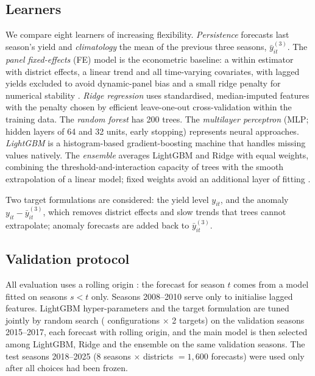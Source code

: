 \subsection{Learners}
We compare eight learners of increasing flexibility. \emph{Persistence} forecasts last season's yield and \emph{climatology} the mean of the previous three seasons, $\bar y^{(3)}_{it}$. The \emph{panel fixed-effects} (FE) model is the econometric baseline: a within estimator with district effects, a linear trend and all time-varying covariates, with lagged yields excluded to avoid dynamic-panel bias and a small ridge penalty for numerical stability \citep{wooldridge2010econometric}. \emph{Ridge regression} \citep{hoerl1970ridge} uses standardised, median-imputed features with the penalty chosen by efficient leave-one-out cross-validation within the training data. The \emph{random forest} \citep{breiman2001random} has 200 trees. The \emph{multilayer perceptron} (MLP; hidden layers of 64 and 32 units, early stopping) represents neural approaches. \emph{LightGBM} \citep{ke2017lightgbm} is a histogram-based gradient-boosting machine that handles missing values natively. The \emph{ensemble} averages LightGBM and Ridge with equal weights, combining the threshold-and-interaction capacity of trees with the smooth extrapolation of a linear model; fixed weights avoid an additional layer of fitting \citep[cf.][]{wolpert1992stacked}.

Two target formulations are considered: the yield level $y_{it}$, and the anomaly $y_{it}-\bar y^{(3)}_{it}$, which removes district effects and slow trends that trees cannot extrapolate; anomaly forecasts are added back to $\bar y^{(3)}_{it}$.

\subsection{Validation protocol}
All evaluation uses a rolling origin \citep{tashman2000out}: the forecast for season $t$ comes from a model fitted on seasons $s<t$ only. Seasons 2008--2010 serve only to initialise lagged features. LightGBM hyper-parameters and the target formulation are tuned jointly by random search (\nTrials{} configurations $\times$ 2 targets) on the validation seasons 2015--2017, each forecast with rolling origin, and the main model is then selected among LightGBM, Ridge and the ensemble on the same validation seasons. The test seasons 2018--2025 (8 seasons $\times$ \nDistricts{} districts $=1{,}600$ forecasts) were used only after all choices had been frozen.

